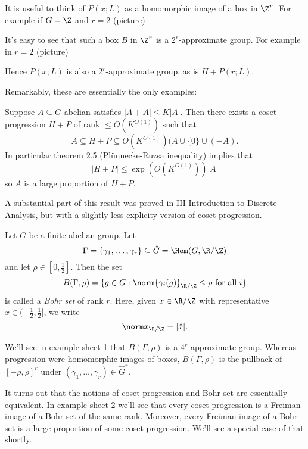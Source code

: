 \documentclass[a4paper]{article}
\begin{document}
It is useful to think of \(P(x; L)\) as a homomorphic image of a box in \(\Z^r\). For example if \(G = \Z\) and \(r = 2\) (picture)

It's easy to see that such a box \(B\) in \(\Z^r\) is a \(2^r\)-approximate group. For example in \(r = 2\) (picture)

Hence \(P(x; L)\) is also a \(2^r\)-approximate group, as is \(H + P(r; L)\).

Remarkably, these are essentially the only examples:

\begin{theorem}[Freiman (\(G = \Z\)), Green-Ruzsa (arbitrary abelian \(G\))]
  Suppose \(A \subseteq G\) abelian satisfies \(|A + A| \leq K |A|\). Then there exists a coset progression \(H + P\) of rank \(\leq O(K^{O(1)})\) such that
  \[
    A \subseteq H + P \subseteq O(K^{O(1)}) (A \cup \{0\} \cup (-A).
  \]
  In particular theorem 2.5 (Plünnecke-Ruzsa inequality) implies that
  \[
    |H + P| \leq \exp(O(K^{O(1)})) |A|
  \]
  so \(A\) is a large proportion of \(H + P\).
\end{theorem}

A substantial part of this result was proved in III Introduction to Discrete Analysis, but with a slightly less explicity version of coset progression.

\begin{definition}
  Let \(G\) be a finite abelian group. Let
  \[
    \Gamma = \{\gamma_1, \dots, \gamma_r\}
    \subseteq \hat G = \Hom(G, \R/\Z)
  \]
  and let \(\rho \in [0, \frac{1}{2}]\). Then the set
  \[
    B(\Gamma, \rho) = \{g \in G: \norm{\gamma_i(g)}_{\R/\Z} \leq \rho \text{ for all } i\}
  \]
  is called a \emph{Bohr set} of rank \(r\). Here, given \(x \in \R/\Z\) with representative \(\hat x \in (-\frac{1}{2}, \frac{1}{2}]\), we write
  \[
    \norm x_{\R/\Z} = |\hat x|.
  \]
\end{definition}

We'll see in example sheet 1 that \(B(\Gamma, \rho)\) is a \(4^r\)-approximate group. Whereas progression were homomorphic images of boxes, \(B(\Gamma, \rho)\) is the pullback of \([-\rho, \rho]^r\) under \((\gamma_1, \dots, \gamma_r) \in \hat G^r\).

It turns out that the notions of coset progression and Bohr set are essentially equivalent. In example sheet 2 we'll see that every coset progression is a Freiman image of a Bohr set of the same rank. Moreover, every Freiman image of a Bohr set is a large proportion of some coset progression. We'll see a special case of that shortly.
\end{document}
